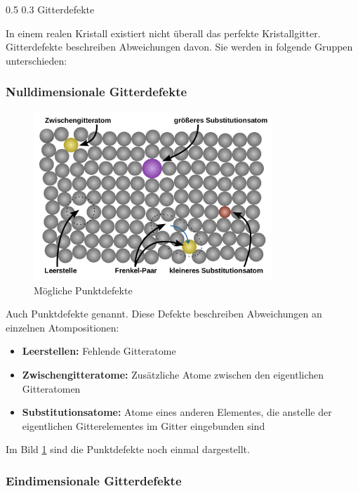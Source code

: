 \documentclass[german, %
parskip=full, %
bibliography=totoc, %
]{scrartcl}
\makeatletter
\renewcommand\subsection{\@startsection 
   {subsection}{2}{0mm}%
   {0.5\baselineskip}%
   {0.3\baselineskip}%
   {\bfseries\sffamily\large}%
   }
\makeatother
\begin{document}
\subsection{Gitterdefekte}

In einem realen Kristall existiert nicht überall das perfekte Kristallgitter. Gitterdefekte beschreiben Abweichungen davon. Sie werden in folgende Gruppen unterschieden: \cite{gitterfehler}

\subsubsection{Nulldimensionale Gitterdefekte}

\begin{figure}[ht] 
  \centering
     \includegraphics[width=0.8\textwidth]{Gitterfehler}
  \caption{Mögliche Punktdefekte \cite{gitterfehler2}}
  \label{fig:gitterdefekte}
\end{figure}

Auch Punktdefekte genannt. Diese Defekte beschreiben Abweichungen an einzelnen Atompositionen:
\begin{itemize}
\item \textbf{Leerstellen:} Fehlende Gitteratome
\item \textbf{Zwischengitteratome:} Zusätzliche Atome zwischen den eigentlichen Gitteratomen
\item \textbf{Substitutionsatome:} Atome eines anderen Elementes, die anstelle der eigentlichen Gitterelementes im Gitter eingebunden sind
\end{itemize}
Im Bild \ref{fig:gitterdefekte} sind die Punktdefekte noch einmal dargestellt.

\subsubsection{Eindimensionale Gitterdefekte}
\end{document}
